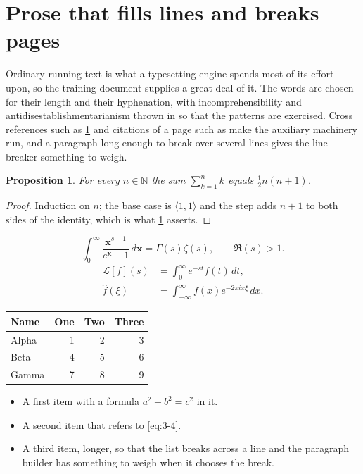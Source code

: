 \documentclass[11pt,a4paper]{report}
\theoremstyle{plain}
\newtheorem{proposition}{Proposition}[chapter]
\newcommand{\vecn}[1]{\mathbf{#1}}
\newcommand{\pairs}[2]{\langle #1,#2\rangle}
\begin{document}
\section{Prose that fills lines and breaks pages}
\label{sec:prose3-4}
Ordinary running text is what a typesetting engine spends most of its effort
upon, so the training document supplies a great deal of it. The words are
chosen for their length and their hyphenation, with incomprehensibility and
antidisestablishmentarianism thrown in so that the patterns are exercised.
Cross references such as \cref{sec:prose3-4} and citations of a page such
as \pageref{sec:prose3-4} make the auxiliary machinery run, and a
paragraph long enough to break over several lines gives the line breaker
something to weigh.
\begin{proposition}\label{prop:3-4}
For every $n\in\mathbb{N}$ the sum $\sum_{k=1}^{n}k$ equals
$\tfrac{1}{2}n(n+1)$.
\end{proposition}
\begin{proof}
Induction on $n$; the base case is $\pairs{1}{1}$ and the step adds $n+1$ to
both sides of the identity, which is what \cref{prop:3-4} asserts.
\end{proof}
\begin{equation}\label{eq:3-4}
  \int_{0}^{\infty}\frac{\vecn{x}^{s-1}}{e^{\vecn{x}}-1}\,d\vecn{x}
    = \Gamma(s)\zeta(s),\qquad \Re(s)>1 .
\end{equation}
\begin{align}
  \mathcal{L}[f](s) &= \int_{0}^{\infty} e^{-st} f(t)\,dt, \\
  \widehat{f}(\xi)  &= \int_{-\infty}^{\infty} f(x) e^{-2\pi i x\xi}\,dx .
\end{align}
\par\noindent\begin{center}
\begin{tabular}{lrrr}
\hline
Name & One & Two & Three \\
\hline
Alpha & 1 & 2 & 3 \\
Beta & 4 & 5 & 6 \\
Gamma & 7 & 8 & 9 \\
\hline
\end{tabular}
\end{center}
\begin{itemize}
  \item A first item with a formula $a^2+b^2=c^2$ in it.
  \item A second item that refers to \eqref{eq:3-4}.
  \item A third item, longer, so that the list breaks across a line and the
    paragraph builder has something to weigh when it chooses the break.
\end{itemize}
\end{document}
